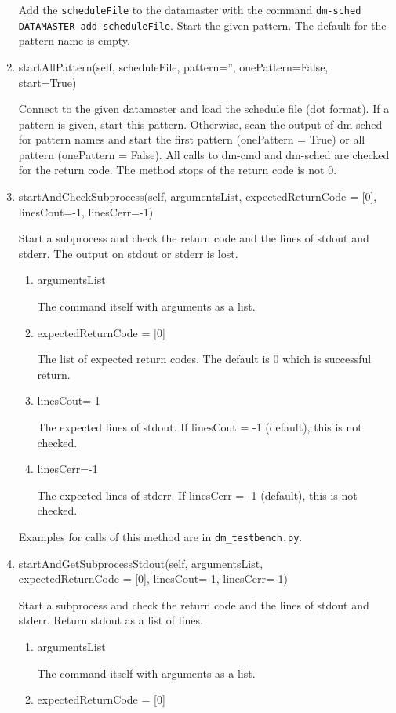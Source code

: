 \documentclass[12pt,a4paper]{report}
\begin{document}
\begin{enumerate}
Add the \texttt{scheduleFile} to the datamaster with the command
\texttt{dm-sched DATAMASTER add scheduleFile}. Start the given pattern.
The default for the pattern name is empty.
\item startAllPattern(self, scheduleFile, pattern='', onePattern=False,\\ start=True)

Connect to the given datamaster and load the schedule file (dot format).
If a pattern is given, start this pattern.
Otherwise, scan the output of dm-sched for pattern names and start the
first pattern (onePattern = True) or all pattern (onePattern = False).
All calls to dm-cmd and dm-sched are checked for the return code. The method
stops of the return code is not 0.

\item startAndCheckSubprocess(self, argumentsList, expectedReturnCode =
[0], linesCout=-1, linesCerr=-1)

Start a subprocess and check the return code and the lines of stdout
and stderr. The output on stdout or stderr is lost.
\begin{enumerate}
\item argumentsList

The command itself with arguments as a list.
\item expectedReturnCode = [0]

The list of expected return codes. The default is 0 which is successful return.
\item linesCout=-1

The expected lines of stdout. If linesCout = -1 (default), this is not checked.
\item linesCerr=-1

The expected lines of stderr. If linesCerr = -1 (default), this is not checked.
\end{enumerate}
Examples for calls of this method are in \texttt{dm\_testbench.py}.
\item startAndGetSubprocessStdout(self, argumentsList, \\
expectedReturnCode = [0], linesCout=-1, linesCerr=-1)

Start a subprocess and check the return code and the lines of stdout
and stderr. Return stdout as a list of lines.
\begin{enumerate}
\item argumentsList

The command itself with arguments as a list.
\item expectedReturnCode = [0]


\end{enumerate}
\end{enumerate}
\end{document}
